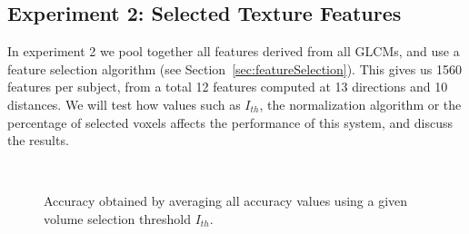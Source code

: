 \subsection{Experiment 2: Selected Texture Features}
In experiment 2 we pool together all features derived from all \acp{GLCM}, and use a feature selection algorithm (see Section~\ref{sec:featureSelection}). This gives us 1560 features per subject, from a total 12 features computed at 13 directions and 10 distances. We will test how values such as $I_{th}$, the normalization algorithm or the percentage of selected voxels affects the performance of this system, and discuss the results. 

\begin{figure}[ht]
	\centering
	\\
	\caption{Accuracy obtained by averaging all accuracy values using a given volume selection threshold $I_{th}$.}
	\label{fig:averageAcc_IthNorm}
\end{figure}

